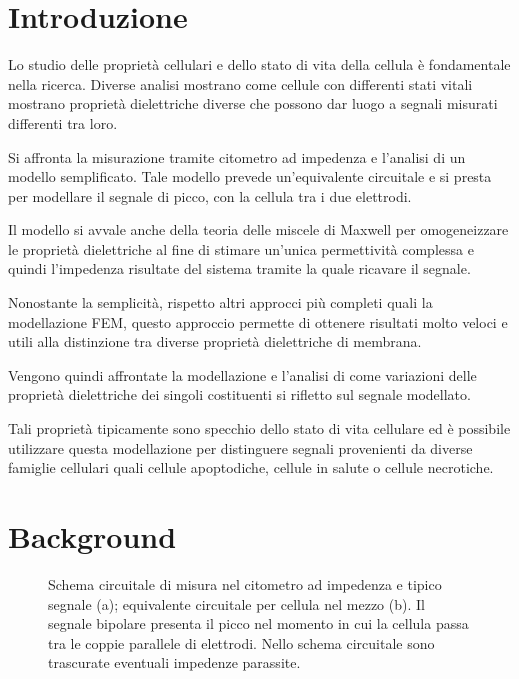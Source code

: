 \section{Introduzione}


Lo studio delle proprietà cellulari e dello stato di vita della cellula è fondamentale nella ricerca. Diverse analisi mostrano come cellule con differenti stati vitali mostrano proprietà dielettriche diverse che possono dar luogo a segnali misurati differenti tra loro.

Si affronta la misurazione tramite citometro ad impedenza e l'analisi di un modello semplificato. Tale modello prevede un'equivalente circuitale e si presta per modellare il segnale di picco, con la cellula tra i due elettrodi.

Il modello si avvale anche della teoria delle miscele di Maxwell per omogeneizzare le proprietà dielettriche al fine di stimare un'unica permettività complessa e quindi l'impedenza risultate del sistema tramite la quale ricavare il segnale.

Nonostante la semplicità, rispetto altri approcci più completi quali la modellazione FEM, questo approccio permette di ottenere risultati molto veloci e utili alla distinzione tra diverse proprietà dielettriche di membrana.

Vengono quindi affrontate la modellazione e l'analisi di come variazioni delle proprietà dielettriche dei singoli costituenti si rifletto sul segnale modellato.

Tali proprietà tipicamente sono specchio dello stato di vita cellulare ed è possibile utilizzare questa modellazione per distinguere segnali provenienti da diverse famiglie cellulari quali cellule apoptodiche, cellule in salute o cellule necrotiche.

\section{Background}

\begin{figure}[h!]
	\begin{subfigure}{0.5\linewidth}
			\centering
				\footnotesize{\def\svgwidth{0.95\linewidth}
				}
				\caption{}
	\end{subfigure}\hfill
	\begin{subfigure}{0.5\linewidth}
	\centering
	\footnotesize{\def\svgwidth{0.8\linewidth}
	}
	\caption{}
\end{subfigure}\hfill
	\caption{Schema circuitale di misura nel citometro ad impedenza e tipico segnale (a); equivalente circuitale per cellula nel mezzo (b). Il segnale bipolare presenta il picco nel momento in cui la cellula passa tra le coppie parallele di elettrodi. Nello schema circuitale sono trascurate eventuali impedenze parassite.}
	\label{fig:modellocircuitale}
\end{figure}



